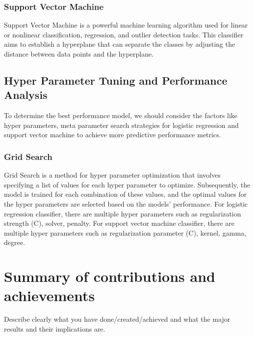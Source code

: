 \subsubsection{Support Vector Machine}
Support Vector Machine is a powerful machine learning algorithm used for linear or nonlinear classification, regression, and outlier detection tasks. This classifier aims to establish a hyperplane that can separate the classes by adjusting the distance between data points and the hyperplane. 


\subsection{Hyper Parameter Tuning and Performance Analysis}
\label{sec:intro_some_sub4}
To determine the best performance model, we should consider the factors like hyper parameters, meta parameter search strategies for logistic regression and support vector machine to achieve more predictive performance metrics.
\subsubsection{Grid Search}
Grid Search is a method for hyper parameter optimization that involves specifying a list of values for each hyper parameter to optimize. Subsequently, the model is trained for each combination of these values, and the optimal values for the hyper parameters are selected based on the models' performance.
For logistic regression classifier, there are multiple hyper parameters such as regularization strength (C), solver, penalty. For support vector machine classifier, there are multiple hyper parameters such as regularization parameter (C), kernel, gamma, degree.

\section{Summary of contributions and achievements} %
\label{sec:intro_sum_results} %
Describe clearly what you have done/created/achieved and what the major results and their implications are. 
